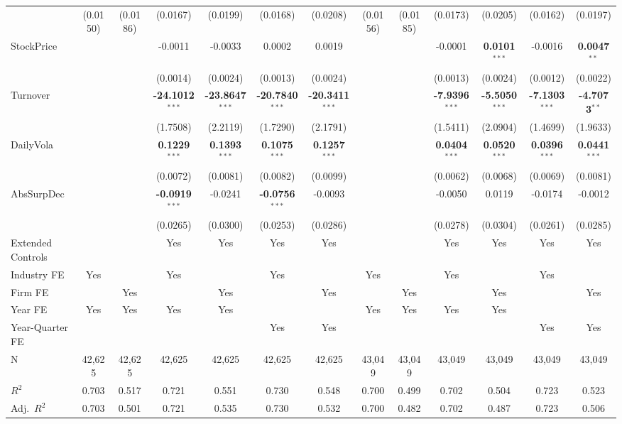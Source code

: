 \documentclass[11pt,a4paper]{article}
\begin{document}
\begin{table}[htbp]
\begin{tabular}{lcccccccccccc}
 & (0.0150) & (0.0186) & (0.0167) & (0.0199) & (0.0168) & (0.0208) & (0.0156) & (0.0185) & (0.0173) & (0.0205) & (0.0162) & (0.0197) \\
StockPrice &  &  & -0.0011 & -0.0033 & 0.0002 & 0.0019 &  &  & -0.0001 & \textbf{0.0101}$^{***}$ & -0.0016 & \textbf{0.0047}$^{**}$ \\
 &  &  & (0.0014) & (0.0024) & (0.0013) & (0.0024) &  &  & (0.0013) & (0.0024) & (0.0012) & (0.0022) \\
Turnover &  &  & \textbf{-24.1012}$^{***}$ & \textbf{-23.8647}$^{***}$ & \textbf{-20.7840}$^{***}$ & \textbf{-20.3411}$^{***}$ &  &  & \textbf{-7.9396}$^{***}$ & \textbf{-5.5050}$^{***}$ & \textbf{-7.1303}$^{***}$ & \textbf{-4.7073}$^{**}$ \\
 &  &  & (1.7508) & (2.2119) & (1.7290) & (2.1791) &  &  & (1.5411) & (2.0904) & (1.4699) & (1.9633) \\
DailyVola &  &  & \textbf{0.1229}$^{***}$ & \textbf{0.1393}$^{***}$ & \textbf{0.1075}$^{***}$ & \textbf{0.1257}$^{***}$ &  &  & \textbf{0.0404}$^{***}$ & \textbf{0.0520}$^{***}$ & \textbf{0.0396}$^{***}$ & \textbf{0.0441}$^{***}$ \\
 &  &  & (0.0072) & (0.0081) & (0.0082) & (0.0099) &  &  & (0.0062) & (0.0068) & (0.0069) & (0.0081) \\
AbsSurpDec &  &  & \textbf{-0.0919}$^{***}$ & -0.0241 & \textbf{-0.0756}$^{***}$ & -0.0093 &  &  & -0.0050 & 0.0119 & -0.0174 & -0.0012 \\
 &  &  & (0.0265) & (0.0300) & (0.0253) & (0.0286) &  &  & (0.0278) & (0.0304) & (0.0261) & (0.0285) \\
\midrule
Extended Controls &  &  & Yes & Yes & Yes & Yes &  &  & Yes & Yes & Yes & Yes \\
Industry FE & Yes &  & Yes &  & Yes &  & Yes &  & Yes &  & Yes &  \\
Firm FE &  & Yes &  & Yes &  & Yes &  & Yes &  & Yes &  & Yes \\
Year FE & Yes & Yes & Yes & Yes &  &  & Yes & Yes & Yes & Yes &  &  \\
Year-Quarter FE &  &  &  &  & Yes & Yes &  &  &  &  & Yes & Yes \\
\midrule
N & 42,625 & 42,625 & 42,625 & 42,625 & 42,625 & 42,625 & 43,049 & 43,049 & 43,049 & 43,049 & 43,049 & 43,049 \\
$R^2$ & 0.703 & 0.517 & 0.721 & 0.551 & 0.730 & 0.548 & 0.700 & 0.499 & 0.702 & 0.504 & 0.723 & 0.523 \\
Adj.~$R^2$ & 0.703 & 0.501 & 0.721 & 0.535 & 0.730 & 0.532 & 0.700 & 0.482 & 0.702 & 0.487 & 0.723 & 0.506 \\

\end{tabular}
\end{table}
\end{document}
